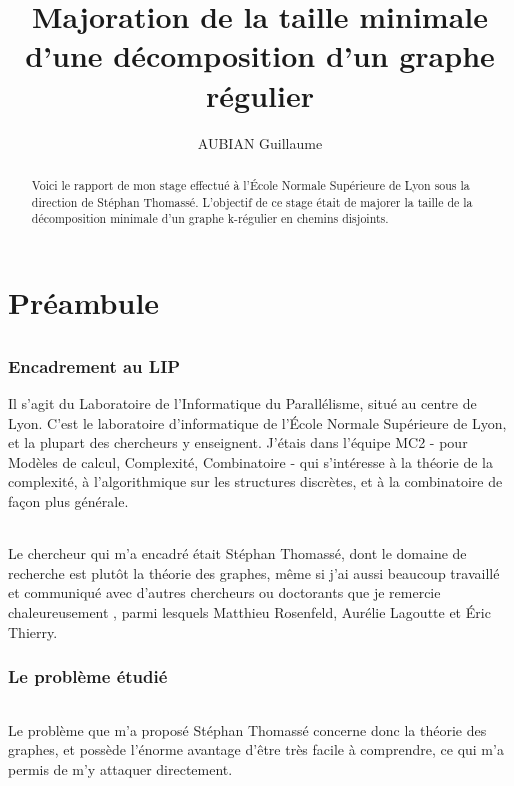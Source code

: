 \documentclass[a4paper]{article}
\title{Majoration de la taille minimale d'une décomposition d'un graphe régulier}
\author{AUBIAN Guillaume}
\theoremstyle{definition}
\theoremstyle{remark}
\begin{document}
\maketitle

\begin{abstract}
Voici le rapport de mon stage effectué à l'École Normale Supérieure de Lyon sous la direction de
Stéphan Thomassé. L'objectif de ce stage était de majorer la taille
de la décomposition minimale d'un graphe k-régulier en chemins disjoints.
\end{abstract}

\part{Préambule}

\paragraph{}

\section{Encadrement au LIP}
Il s'agit du Laboratoire de l'Informatique du Parallélisme, situé au centre de Lyon. C'est le laboratoire d'informatique de l'École Normale 
Supérieure de Lyon, et la plupart des chercheurs y enseignent. J'étais dans l'équipe MC2 - pour Modèles de calcul, Complexité, Combinatoire -
qui s'intéresse à la théorie de la complexité, à 
l'algorithmique sur les structures discrètes, et à la combinatoire de 
façon plus générale.


\paragraph{}
Le chercheur qui m'a encadré était Stéphan Thomassé, dont le domaine
de recherche est plutôt la théorie des graphes, même si j'ai aussi
beaucoup travaillé et communiqué avec d'autres chercheurs ou doctorants 
que je remercie chaleureusement , parmi lesquels Matthieu Rosenfeld, Aurélie Lagoutte et Éric Thierry.


\section{Le problème étudié}

\paragraph{}
Le problème que m'a proposé Stéphan Thomassé concerne donc la théorie 
des graphes, et possède l'énorme avantage d'être très facile à 
comprendre, ce qui m'a permis de m'y attaquer directement.
\end{document}
